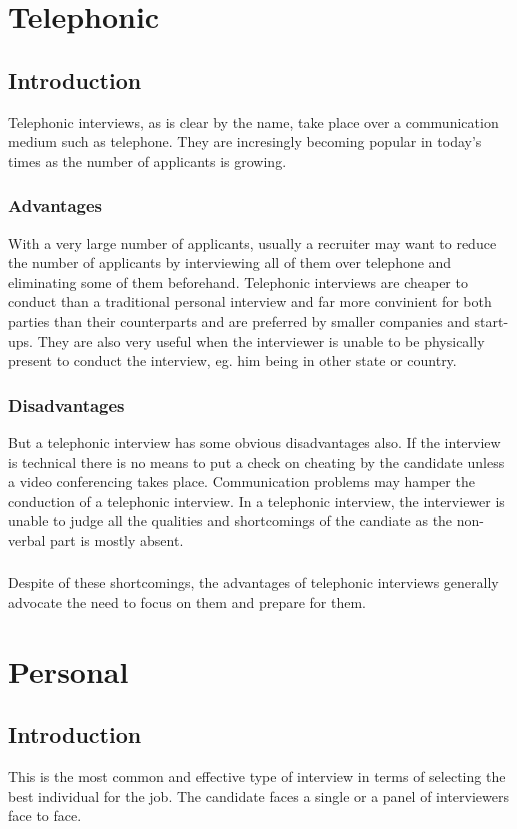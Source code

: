 \documentclass[a4paper,12pt]{report}
\begin{document}
\section{Telephonic}     %
\subsection{Introduction}  %
Telephonic interviews, as is clear by the name, take place over a communication medium such as telephone.
They are incresingly becoming popular in today's times as the number of applicants is growing.
\subsubsection{Advantages}
With a very large number of applicants, usually a recruiter may want to reduce the number of applicants by interviewing all of them over telephone and eliminating
some of them beforehand. Telephonic interviews are cheaper to conduct than a traditional personal interview and far more convinient
for both parties than their counterparts and are preferred by smaller companies and start-ups. They are also very useful when the interviewer is unable to be physically
present to conduct the interview, eg. him being in other state or country.
\subsubsection{Disadvantages}
But a telephonic interview has some obvious disadvantages also. If the interview is technical there is no
means to put a check on cheating by the candidate unless a video conferencing takes place. Communication problems
may hamper the conduction of a telephonic interview. In a telephonic interview, the interviewer is unable to
judge all the qualities and shortcomings of the candiate as the non-verbal part is mostly absent.
\subsubsection{}
Despite of these shortcomings, the advantages of telephonic interviews generally advocate the need to focus
on them and prepare for them.
\section{Personal}         %
\subsection{Introduction}  %
This is the most common and effective type of interview in terms of selecting the best individual for the job.
The candidate faces a single or a panel of interviewers face to face. 
\end{document}
